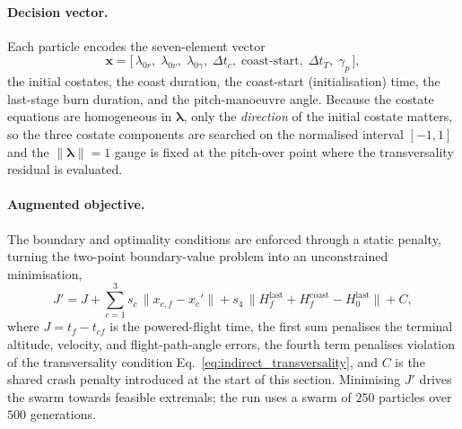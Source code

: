 \paragraph{Decision vector.}
Each particle encodes the seven-element vector
\begin{equation}
  \mathbf{x} = \bigl[\,\lambda_{0r},\;\lambda_{0v},\;\lambda_{0\gamma},\;
        \Delta t_c,\; \text{coast-start},\; \Delta t_T,\; \gamma_p\,\bigr],
  \label{eq:indirect_vector}
\end{equation}
the initial costates, the coast duration, the coast-start (initialisation) time,
the last-stage burn duration, and the pitch-manoeuvre angle. Because the costate
equations are homogeneous in $\boldsymbol\lambda$, only the \emph{direction} of
the initial costate matters, so the three costate components are searched on the
normalised interval $[-1,1]$ and the $\lVert\boldsymbol\lambda\rVert=1$ gauge is
fixed at the pitch-over point where the transversality residual is evaluated.

\paragraph{Augmented objective.}
The boundary and optimality conditions are enforced through a static penalty,
turning the two-point boundary-value problem into an unconstrained minimisation,
\begin{equation}
  J' = J + \sum_{c=1}^{3} s_c\,\bigl\lVert x_{c,f}-x_c'\bigr\rVert
     + s_4\,\bigl\lVert H_f^{\mathrm{last}} + H_f^{\mathrm{coast}}
                      - H_0^{\mathrm{last}}\bigr\rVert + C,
  \label{eq:indirect_augmented}
\end{equation}
where $J=t_f-t_{cf}$ is the powered-flight time, the first sum penalises the
terminal altitude, velocity, and flight-path-angle errors, the fourth term
penalises violation of the transversality condition
Eq.~\eqref{eq:indirect_transversality}, and $C$ is the shared crash penalty
introduced at the start of this section. Minimising $J'$ drives the swarm towards
feasible extremals; the run uses a swarm of $250$ particles over $500$ generations.

